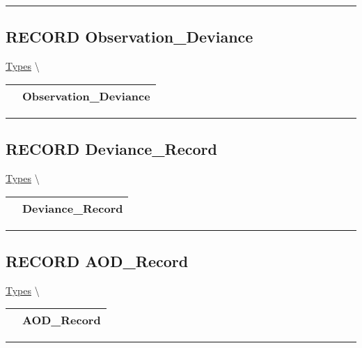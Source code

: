 \par


\rule{\linewidth}{0.5pt}
\subsection*{\textsf{\colorbox{headtoc}{\color{white} RECORD}
Observation\_Deviance}}

\hypertarget{ecldoc:types.observation_deviance}{}
\hspace{0pt} \hyperlink{ecldoc:Types}{Types} \textbackslash 

{\renewcommand{\arraystretch}{1.5}
\begin{tabularx}{\textwidth}{|>{\raggedright\arraybackslash}l|X|}
\hline
\hspace{0pt}\mytexttt{\color{red} } & \textbf{Observation\_Deviance} \\
\hline
\end{tabularx}
}

\par


\rule{\linewidth}{0.5pt}
\subsection*{\textsf{\colorbox{headtoc}{\color{white} RECORD}
Deviance\_Record}}

\hypertarget{ecldoc:types.deviance_record}{}
\hspace{0pt} \hyperlink{ecldoc:Types}{Types} \textbackslash 

{\renewcommand{\arraystretch}{1.5}
\begin{tabularx}{\textwidth}{|>{\raggedright\arraybackslash}l|X|}
\hline
\hspace{0pt}\mytexttt{\color{red} } & \textbf{Deviance\_Record} \\
\hline
\end{tabularx}
}

\par


\rule{\linewidth}{0.5pt}
\subsection*{\textsf{\colorbox{headtoc}{\color{white} RECORD}
AOD\_Record}}

\hypertarget{ecldoc:types.aod_record}{}
\hspace{0pt} \hyperlink{ecldoc:Types}{Types} \textbackslash 

{\renewcommand{\arraystretch}{1.5}
\begin{tabularx}{\textwidth}{|>{\raggedright\arraybackslash}l|X|}
\hline
\hspace{0pt}\mytexttt{\color{red} } & \textbf{AOD\_Record} \\
\hline
\end{tabularx}
}

\par


\rule{\linewidth}{0.5pt}


